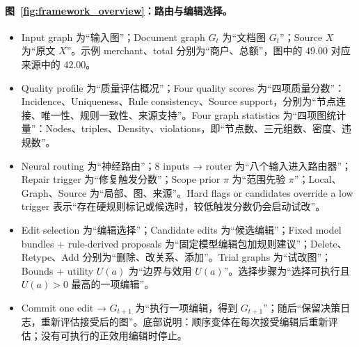\paragraph{图~\ref{fig:framework_overview}：路由与编辑选择。}
\begin{itemize}
\item Input graph 为“输入图”；Document graph $G_t$ 为“文档图 $G_t$”；Source $X$ 为“原文 $X$”。示例 merchant、total 分别为“商户、总额”，图中的 49.00 对应来源中的 42.00。
\item Quality profile 为“质量评估概况”；Four quality scores 为“四项质量分数”：Incidence、Uniqueness、Rule consistency、Source support，分别为“节点连接、唯一性、规则一致性、来源支持”。Four graph statistics 为“四项图统计量”：Nodes、triples、Density、violations，即“节点数、三元组数、密度、违规数”。
\item Neural routing 为“神经路由”；8 inputs → router 为“八个输入进入路由器”；Repair trigger 为“修复触发分数”；Scope prior $\pi$ 为“范围先验 $\pi$”；Local、Graph、Source 为“局部、图、来源”。Hard flags or candidates override a low trigger 表示“存在硬规则标记或候选时，较低触发分数仍会启动试改”。
\item Edit selection 为“编辑选择”；Candidate edits 为“候选编辑”；Fixed model bundles + rule-derived proposals 为“固定模型编辑包加规则建议”；Delete、Retype、Add 分别为“删除、改关系、添加”。Trial graphs 为“试改图”；Bounds + utility $U(a)$ 为“边界与效用 $U(a)$”。选择步骤为“选择可执行且 $U(a)>0$ 最高的一项编辑”。
\item Commit one edit → $G_{t+1}$ 为“执行一项编辑，得到 $G_{t+1}$”；随后“保留决策日志，重新评估接受后的图”。底部说明：顺序变体在每次接受编辑后重新评估；没有可执行的正效用编辑时停止。
\end{itemize}


